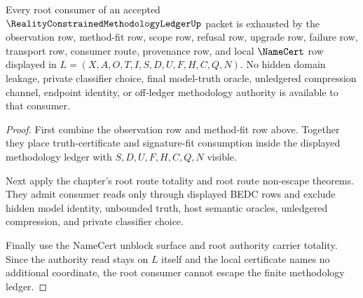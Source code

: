\begin{theorem}
\label{thm:reality-constrained-methodology-ledger-nonescape}
Every root consumer of an accepted $\RealityConstrainedMethodologyLedgerUp$
packet is exhausted by the observation row, method-fit row, scope row, refusal
row, upgrade row, failure row, transport row, consumer route, provenance row,
and local $\NameCert$ row displayed in
$L=(X,A,O,T,I,S,D,U,F,H,C,Q,N)$. No hidden domain leakage, private classifier
choice, final model-truth oracle, unledgered compression channel, endpoint
identity, or off-ledger methodology authority is available to that consumer.
\end{theorem}
\begin{proof}
First combine the observation row and method-fit row above. Together they
place truth-certificate and signature-fit consumption inside the displayed
methodology ledger with $S,D,U,F,H,C,Q,N$ visible.

Next apply the chapter's root route totality and root route non-escape
theorems. They admit consumer reads only through displayed BEDC rows and
exclude hidden model identity, unbounded truth, host semantic oracles,
unledgered compression, and private classifier choice.

Finally use the NameCert unblock surface and root authority carrier totality.
Since the authority read stays on $L$ itself and the local certificate names no
additional coordinate, the root consumer cannot escape the finite methodology
ledger.
\end{proof}
